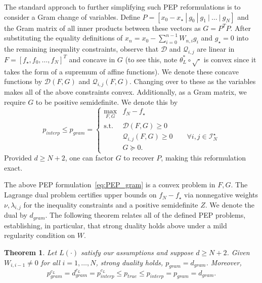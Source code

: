 \documentclass[11pt, hidelinks]{article}
\numberwithin{equation}{section}
\theoremstyle{thmstyletwo}%
\newtheorem{theorem}[thm]{Theorem}
\numberwithin{equation}{section}
\newcommand{\Ical}{\mathcal{I}}
\newcommand{\pPEP}[1]{p_{#1}}
\newcommand{\dPEP}[1]{d_{#1}}
\begin{document}
The standard approach to further simplifying such PEP reformulations is to consider a Gram change of variables. Define $P = [x_0-x_\star \ | \ g_0 \ |\  g_1 \ |\  \dots\ | \ g_N]$ and the Gram matrix of all inner products between these vectors as $G=P^TP$. After substituting the equality definitions of  $x_n = x_{0} - \sum_{i=0}^{n-1} W_{n,i} g_i$ and $g_\star=0$ into the remaining inequality constraints, observe that $\mathcal{D}$ and $\mathcal{Q}_{i,j}$ are linear in $F=[f_\star,f_0,\dots, f_N]^T$ and concave in $G$ (to see this, note $\theta_L^*\circ\sqrt{\cdot}$ is convex since it takes the form of a supremum of affine functions). We denote these concave functions by $\mathcal{D}(F,G)$ and $\mathcal{Q}_{i,j}(F,G)$. Changing over to these as the variables makes all of the above constraints convex. Additionally, as a Gram matrix, we require $G$ to be positive semidefinite.  We denote this by
\begin{equation}\label{eq:PEP_gram}
    \pPEP{interp} \leq \pPEP{gram} = \begin{cases}\displaystyle\max_{F,G} & f_N-f_\star  \\
    \mathrm{s.t.} & \mathcal{D}(F,G) \geq 0 \\
    & \mathcal{Q}_{i,j}(F,G) \geq 0 \qquad  \forall i, j \in \Ical_N^\star\\
    & G\succeq 0.
    \end{cases}
\end{equation}
Provided $d\geq N+2$, one can factor $G$ to recover $P$, making this reformulation exact.

The above PEP formulation~\eqref{eq:PEP_gram} is a convex problem in $F,G$. The Lagrange dual problem certifies upper bounds on $f_N-f_\star$ via nonnegative weights $\nu,\lambda_{i,j}$ for the inequality constraints and a positive semidefinite $Z$. We denote the dual by $\dPEP{gram}$. The following theorem relates all of the defined PEP problems, establishing, in particular, that strong duality holds above under a mild regularity condition on $W$.

\begin{theorem}\label{thm:strong duality}
    Let $L(\cdot)$ satisfy our assumptions and suppose $d \geq N+2$. Given $W_{i,i-1} \ne 0$ for all $i = 1, \dots,  N$, strong duality holds, $\pPEP{gram}=\dPEP{gram}$. Moreover, $$\pPEP{gram}^{c_L} = \dPEP{gram}^{c_L} = \pPEP{interp}^{c_L} \leq \pPEP{true} \leq \pPEP{interp} = \pPEP{gram}= \dPEP{gram} .$$
\end{theorem}
\end{document}
